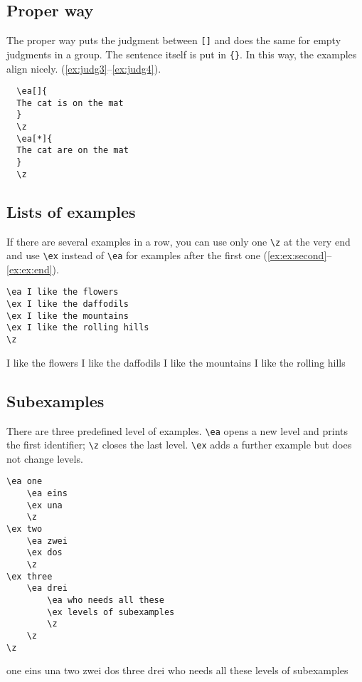 \documentclass[output=paper]{langscibook}
\newcommand{\cmd}[1]{\texttt{\textbackslash#1}}
\begin{document}
\subsection{Proper way}  
The proper way puts the judgment between \texttt{[]} and does the same for empty judgments in a group. The sentence itself is put in \texttt{\{\}}. In this way, the examples align nicely. (\ref{ex:judg3}--\ref{ex:judg4}).
  
\begin{minipage}{.45\textwidth}
\begin{lstlisting}
  \ea[]{ 
  The cat is on the mat
  }
  \z 
  \ea[*]{ 
  The cat are on the mat
  }
  \z
\end{lstlisting}
\end{minipage}
\parbox[b]{.45\textwidth}{
  \z 
  \z
  }
  
 
\subsection{Lists of examples}
If there are several examples in a row, you can use only one \cmd{z} at the very end and use \cmd{ex} instead of \cmd{ea} for examples after the first one (\ref{ex:ex:second}--\ref{ex:ex:end}).

\begin{minipage}{.45\textwidth}
\begin{lstlisting}
\ea I like the flowers
\ex I like the daffodils
\ex I like the mountains
\ex I like the rolling hills
\z
\end{lstlisting}
\end{minipage}
\parbox{.45\textwidth}{
\ea I like the flowers\label{ex:ex:start}
\ex I like the daffodils\label{ex:ex:second}
\ex I like the mountains
\ex I like the rolling hills\label{ex:ex:end}
\z
}

\subsection{Subexamples}
There are three predefined level of examples. \cmd{ea} opens a new level and prints the first identifier; \cmd{z} closes the last level. \cmd{ex} adds a further example but does not change levels. 

\begin{minipage}{.55\textwidth}
\begin{lstlisting}
\ea one
    \ea eins
    \ex una
    \z
\ex two
    \ea zwei
    \ex dos
    \z
\ex three
    \ea drei
        \ea who needs all these
        \ex levels of subexamples
        \z
    \z
\z
 \end{lstlisting}
\end{minipage}
\parbox{.45\textwidth}{
\ea one
    \ea eins
    \ex una
    \z
\ex two
    \ea zwei
    \ex dos
    \z
\ex three
    \ea drei
        \ea who needs all these
        \ex levels of subexamples
        \z
    \z
\z
}
\end{document}
